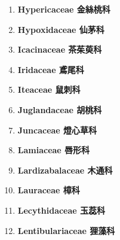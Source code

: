 \begin{enumerate}
        
      \item[] \begin{small}\textbf{Hypericaceae 金絲桃科} \end{small}
        
      \item[] \begin{small}\textbf{Hypoxidaceae 仙茅科} \end{small}
        
      \item[] \begin{small}\textbf{Icacinaceae 茶茱萸科} \end{small}
        
      \item[] \begin{small}\textbf{Iridaceae 鳶尾科} \end{small}
        
      \item[] \begin{small}\textbf{Iteaceae 鼠刺科} \end{small}
        
      \item[] \begin{small}\textbf{Juglandaceae 胡桃科} \end{small}
        
      \item[] \begin{small}\textbf{Juncaceae 燈心草科} \end{small}
        
      \item[] \begin{small}\textbf{Lamiaceae 唇形科} \end{small}
        
      \item[] \begin{small}\textbf{Lardizabalaceae 木通科} \end{small}
        
      \item[] \begin{small}\textbf{Lauraceae 樟科} \end{small}
        
      \item[] \begin{small}\textbf{Lecythidaceae 玉蕊科} \end{small}
        
      \item[] \begin{small}\textbf{Lentibulariaceae 狸藻科} \end{small}

\end{enumerate}
